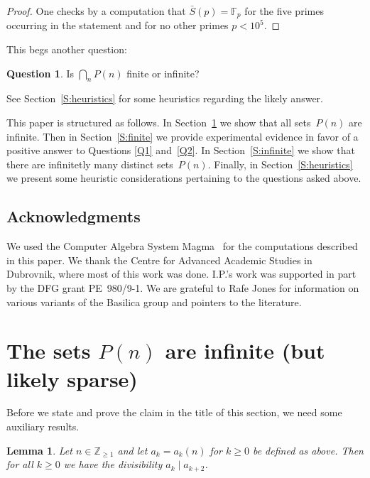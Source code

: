 \documentclass[12pt,a4paper]{amsart}
\newcommand{\Z}{{\mathbb Z}}
\newcommand{\F}{{\mathbb F}}
\newtheorem{Lemma}[Theorem]{Lemma}
\theoremstyle{definition}
\newtheorem{Question}[Theorem]{Question}
\numberwithin{equation}{section}
\begin{document}
\begin{proof}
  One checks by a computation that $\bar{S}(p) = \F_p$ for the five primes
    occurring in the statement and for no other primes $p < 10^5$.
\end{proof}

This begs another question:

\begin{Question} \label{Q3}
  Is $\bigcap_n P(n)$ finite or infinite?
\end{Question}

See Section~\ref{S:heuristics} for some heuristics regarding the likely answer.

\medskip

This paper is structured as follows. In Section~\ref{S:P_infinite} we show that
all sets~$P(n)$ are infinite. Then in Section~\ref{S:finite} we provide experimental
evidence in favor of a positive answer to Questions \ref{Q1} and~\ref{Q2}.
In Section~\ref{S:infinite} we show that there are infinitetly many distinct
sets~$P(n)$. Finally, in Section~\ref{S:heuristics} we present some heuristic
considerations pertaining to the questions asked above.

\subsection*{Acknowledgments}

We used the Computer Algebra System Magma~\cite{Magma} for the computations
described in this paper. We thank the Centre for Advanced Academic Studies in Dubrovnik,
where most of this work was done. I.P.'s work was supported in part by the DFG grant PE~980/9-1.
We are grateful to Rafe Jones for information on various variants of the Basilica group
and pointers to the literature.


\section{The sets $P(n)$ are infinite (but likely sparse)} \label{S:P_infinite}

Before we state and prove the claim in the title of this section,
we need some auxiliary results.

\begin{Lemma} \label{L:prelim}
  Let $n \in \Z_{\geqslant 1}$ and let $a_k = a_k(n)$ for $k \geqslant 0$ be defined as above.
  Then for all $k \geqslant 0$ we have the divisibility $a_k \mid a_{k+2}$.
\end{Lemma}
\end{document}

